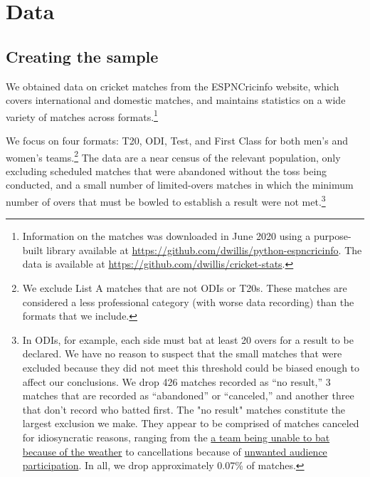 \documentclass[11pt,  letterpaper]{article}
\begin{document}

\section{Data}

\subsection{Creating the sample}

We obtained data on cricket matches from the ESPNCricinfo website, which covers international and domestic matches, and maintains statistics on a wide variety of matches across formats.\footnote{Information on the matches was downloaded in June 2020 using a purpose-built library available at \href{https://github.com/dwillis/python-espncricinfo}{https://github.com/dwillis/python-espncricinfo}. The data is available at \href{https://github.com/dwillis/cricket-stats}{https://github.com/dwillis/cricket-stats}.} 

We focus on four formats: T20, ODI, Test, and First Class for both men's and women's teams.\footnote{We exclude List A matches that are not ODIs or T20s. These matches are considered a less professional category (with worse data recording) than the formats that we include.} The data are a near census of the relevant population, only excluding scheduled matches that were abandoned without the toss being conducted, and a small number of limited-overs matches in which the minimum number of overs that must be bowled to establish a result were not met.\footnote{In ODIs, for example, each side must bat at least 20 overs for a result to be declared. We have no reason to suspect that the small matches that were excluded because they did not meet this threshold could be biased enough to affect our conclusions. We drop 426 matches recorded as ``no result,'' 3 matches that are recorded as ``abandoned'' or ``canceled,'' and another three that don't record who batted first. The "no result" matches constitute the largest exclusion we make. They appear to be comprised of matches canceled for idiosyncratic reasons, ranging from the \href{https://www.espncricinfo.com/series/shell-tri-series-1991-92-61203/australia-women-vs-england-women-final-66975/full-scorecard}{a team being unable to bat because of the weather} to cancellations because of \href{https://www.espncricinfo.com/series/australia-tour-of-pakistan-1982-83-61392/pakistan-vs-australia-3rd-odi-64196/full-scorecard}{unwanted audience participation}. In all, we drop approximately 0.07\% of matches.}
\end{document}
